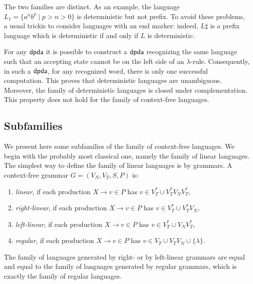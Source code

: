 The two families are distinct. As an example, the language $L_1 = \{a^n b^p \mid p > n > 0\}$ is deterministic but not prefix. To avoid these problems, a usual trickis to consider languages with an end marker: indeed, $L \sharp$ is a prefix language which is deterministic if and only if $L$ is deterministic.

For any $\mbox{\sf dpda}$ it is possible to construct a $\mbox{\sf dpda}$ recognizing the same language such that an accepting state cannot be on the left side of an $\lambda$-rule. Consequently, in such a $\mbox{\sf dpda}$, for any recognized word, there is only one successful computation. This proves that deterministic languages are unambiguous. Moreover, the family of deterministic languages is closed under complementation. This property does not hold for the family of context-free languages.

\subsection{Subfamilies}
\label{subsection:context-free-subfamilies}

We present here some subfamilies of the family of context-free languages. We begin with the probably most classical one, namely the family of linear languages. The simplest way to define the family of linear languages is by grammars. A context-free grammar $G = (V_N, V_T, S, P)$ is:

\begin{enumerate}[]
\item {}\emph{linear}, if each production $X \to v \in P$ has $v \in V_T^* \cup V_T^* V_N V_T^*$,
\item {}\emph{right-linear}, if each production $X \to v \in P$ has $v \in V_T^* \cup V_T^* V_N$,
\item {}\emph{left-linear}, if each production $X \to v \in P$ has $v \in V_T^* \cup V_N V_T^*$,
\item {}\emph{regular}, if each production $X \to v \in P$ has $v \in V_T \cup V_T V_N \cup \{\lambda\}$.
\end{enumerate}

The family of languages generated by right- or by left-linear grammars are equal and equal to the family of languages generated by regular grammars, which is exactly the family of regular languages.

